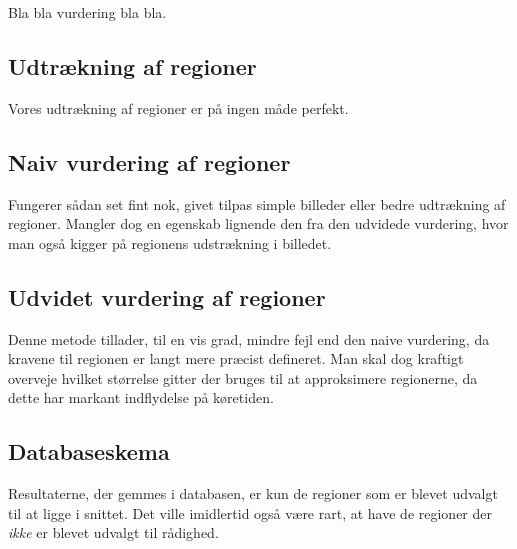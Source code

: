 {
{\sffamily Bla bla vurdering bla bla.
}

\subsection{Udtrækning af regioner}
Vores udtrækning af regioner er på ingen måde perfekt.

\subsection{Naiv vurdering af regioner}
Fungerer sådan set fint nok, givet tilpas simple billeder eller bedre
udtrækning af regioner. Mangler dog en egenskab lignende den fra den
udvidede vurdering, hvor man også kigger på regionens udstrækning i
billedet.

\subsection{Udvidet vurdering af regioner}
Denne metode tillader, til en vis grad, mindre fejl end den naive
vurdering, da kravene til regionen er langt mere præcist defineret. Man
skal dog kraftigt overveje hvilket størrelse gitter der bruges til at
approksimere regionerne, da dette har markant indflydelse på køretiden.

\subsection{Databaseskema}
Resultaterne, der gemmes i databasen, er kun de regioner som er blevet
udvalgt til at ligge i snittet. Det ville imidlertid også være rart, at
have de regioner der \emph{ikke} er blevet udvalgt til rådighed.

}

